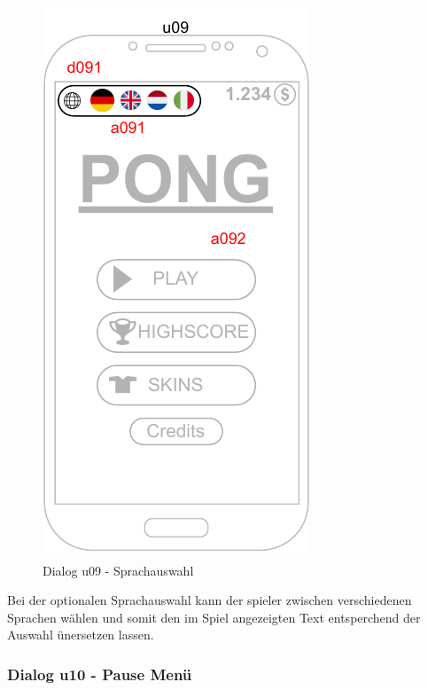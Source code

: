 \begin{figure}
    \begin{center}
    \includegraphics{diagramme/pdf/Mockup-u09.pdf}
\end{center}
    \caption{Dialog u09 - Sprachauswahl}
\end{figure}

Bei der optionalen Sprachauswahl kann der \gls{spieler} zwischen verschiedenen Sprachen wählen und somit den im Spiel angezeigten Text entsperchend der Auswahl ünersetzen lassen.
\clearpage

\subsubsection{Dialog u10 - Pause Menü}

